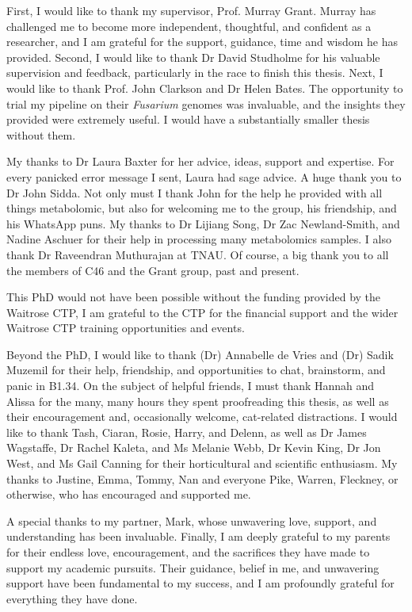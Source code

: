 
First, I would like to thank my supervisor, Prof. Murray Grant. Murray has challenged me to become more independent, thoughtful, and confident as a researcher, and I am grateful for the support, guidance, time and wisdom he has provided. Second, I would like to thank Dr David Studholme for his valuable supervision and feedback, particularly in the race to finish this thesis. Next, I would like to thank Prof. John Clarkson and Dr Helen Bates. The opportunity to trial my pipeline on their \textit{Fusarium} genomes was invaluable, and the insights they provided were extremely useful. I would have a substantially smaller thesis without them. 

My thanks to Dr Laura Baxter for her advice, ideas, support and expertise. For every panicked error message I sent, Laura had sage advice. A huge thank you to Dr John Sidda. Not only must I thank John for the help he provided with all things metabolomic, but also for welcoming me to the group, his friendship, and his WhatsApp puns. My thanks to Dr Lijiang Song, Dr Zac Newland-Smith, and Nadine Aschuer for their help in processing many metabolomics samples. I also thank Dr Raveendran Muthurajan at TNAU. Of course, a big thank you to all the members of C46 and the Grant group, past and present. 

This PhD would not have been possible without the funding provided by the Waitrose CTP, I am grateful to the CTP for the financial support and the wider Waitrose CTP training opportunities and events. 

Beyond the PhD, I would like to thank (Dr) Annabelle de Vries and (Dr) Sadik Muzemil for their help, friendship, and opportunities to chat, brainstorm, and panic in B1.34. On the subject of helpful friends, I must thank Hannah and Alissa for the many, many hours they spent proofreading this thesis, as well as their encouragement and, occasionally welcome, cat-related distractions. I would like to thank Tash, Ciaran, Rosie, Harry, and Delenn, as well as Dr James Wagstaffe, Dr Rachel Kaleta, and Ms Melanie Webb, Dr Kevin King, Dr Jon West, and Ms Gail Canning for their horticultural and scientific enthusiasm. My thanks to Justine, Emma, Tommy, Nan and everyone Pike, Warren,  Fleckney, or otherwise, who has encouraged and supported me.  

A special thanks to my partner, Mark, whose unwavering love, support, and understanding has been invaluable. Finally, I am deeply grateful to my parents for their endless love, encouragement, and the sacrifices they have made to support my academic pursuits. Their guidance, belief in me, and unwavering support have been fundamental to my success, and I am profoundly grateful for everything they have done. 




